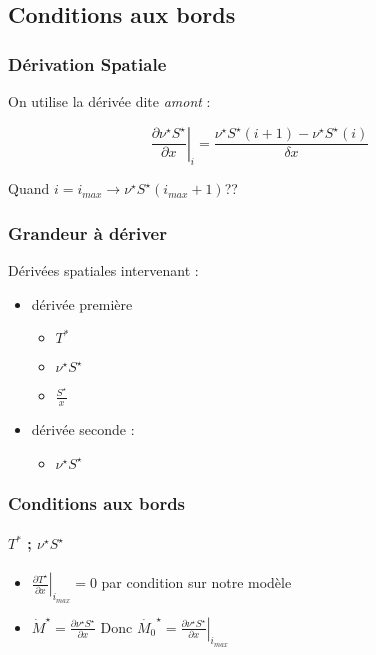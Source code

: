 \subsection{Conditions aux bords}


\begin{frame}
\frametitle{Dérivation Spatiale}

On utilise la dérivée dite \textit{amont} : 

\begin{equation*}
\left. \frac{\partial \nu^{\star} S^{\star}}{\partial x} \right|_i = \frac{\nu^{\star}S^{\star}(i+1)-\nu^{\star}S^{\star}(i)}{\delta x} 
\end{equation*}


Quand $i=i_{max} \rightarrow \nu^{\star}S^{\star}(i_{max}+1) $??

\end{frame}


\begin{frame}
\frametitle{Grandeur à dériver}
Dérivées spatiales intervenant :

\begin{itemize}
    \item dérivée première
    \begin{itemize}
        \item $T^*$
        \item $ \nu^{\star}S^{\star}$
        \item $\frac{S^{\star}}{x}$
    \end{itemize}
    \item dérivée seconde :
    \begin{itemize}
        \item $ \nu^{\star}S^{\star}$
    \end{itemize}
\end{itemize}

\end{frame}


\begin{frame}
\frametitle{Conditions aux bords}
\framesubtitle{$T^*$ ; $\nu^{\star} S^{\star}$}

\begin{itemize}

\item $\left.\frac{\partial T^{\star}}{\partial x}\right|_{i_{max}} =0$ par condition sur notre modèle

\item $\dot{M}^{\star} = \frac{\partial \nu^{\star} S^{\star}}{\partial x}$ Donc $ \dot{M_0}^{\star} = \left. \frac{\partial \nu^{\star} S^{\star}}{\partial x} \right|_{i_{max}} $

\end{itemize}

\end{frame}

